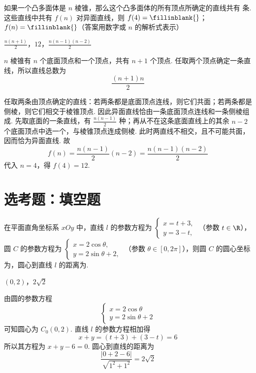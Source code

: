 \begin{problem}
如果一个凸多面体是 \(n\) 棱锥，那么这个凸多面体的所有顶点所确定的直线共有\fillinblank{} 条. 这些直线中共有 \(f(n)\) 对异面直线，则 \(f(4) =\fillinblank{}\)； \(f(n) =\fillinblank{}\)（答案用数字或 \(n\) 的解析式表示）
\end{problem}

\begin{answer}
\(\frac{n(n+1)}{2}\)，\(12\)，\(\frac{n(n-1)(n-2)}{2}\)
\end{answer}

\begin{solution}
\(n\) 棱锥有 \(n\) 个底面顶点和一个顶点，共有 \(n+1\) 个顶点. 任取两个顶点确定一条直线，所以直线总数为
\[
\frac{(n+1)n}{2}
\]

任取两条由顶点确定的直线：若两条都是底面顶点连线，则它们共面；若两条都是侧棱，则它们相交于棱锥顶点. 因此异面直线恰由一条底面顶点连线和一条侧棱组成. 先取底面的一条直线，有 \(\frac{n(n-1)}2\) 种；再从不在这条底面直线上的其余 \(n-2\) 个底面顶点中选一个，与棱锥顶点连成侧棱. 此时两直线不相交，且不可能共面，因而恰为异面直线. 故
\[
f(n)=\frac{n(n-1)}2(n-2)=\frac{n(n-1)(n-2)}2
\]
代入 \(n=4\)，得 \(f(4)=12\).
\end{solution}

\section{选考题：填空题}

\begin{problem}
在平面直角坐标系 \(xOy\) 中，直线 \(l\) 的参数方程为 \(\begin{cases}
x = t + 3,\\
y = 3 - t,
\end{cases}\) （参数 \(t \in \R\)），圆 \(C\) 的参数方程为 \(\begin{cases}
x = 2\cos \theta,\\
y = 2\sin \theta + 2,
\end{cases}\) （参数 \(\theta \in [0, 2\pi]\)），则圆 \(C\) 的圆心坐标为\fillinblank{}，圆心到直线 \(l\) 的距离为\fillinblank{}.
\end{problem}

\begin{answer}
\((0,2)\)，\(2\sqrt{2}\)
\end{answer}

\begin{solution}
由圆的参数方程
\[
\begin{cases}
x=2\cos\theta\\
y=2\sin\theta+2
\end{cases}
\]
可知圆心为 \(C_0(0,2)\). 直线 \(l\) 的参数方程相加得
\[
x+y=(t+3)+(3-t)=6
\]
所以其方程为 \(x+y-6=0\). 圆心到直线的距离为
\[
\frac{|0+2-6|}{\sqrt{1^2+1^2}}=2\sqrt2
\]
\end{solution}

